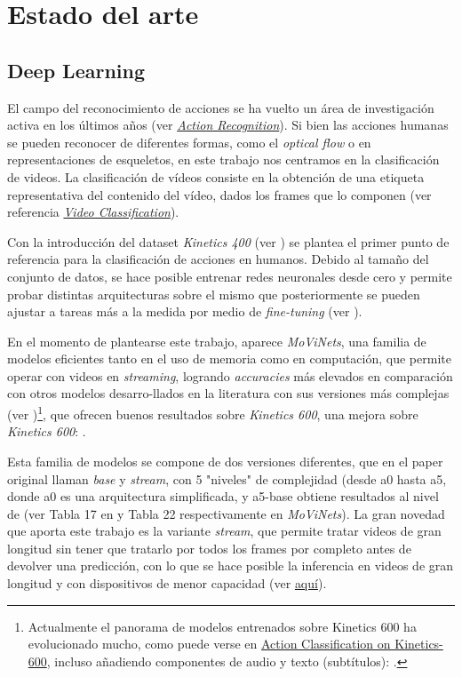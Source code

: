 \chapter{Estado del arte}

\section{Deep Learning}

El campo del reconocimiento de acciones se ha vuelto un área de investigación activa en los últimos años (ver \href{https://paperswithcode.com/task/action-recognition-in-videos}{\textit{Action Recognition}}). Si bien las acciones humanas se pueden reconocer de diferentes formas, como el \textit{optical flow} o en representaciones de esqueletos, en este trabajo nos centramos en la clasificación de videos. La clasificación de vídeos consiste en la obtención de una etiqueta representativa del contenido del vídeo, dados los frames que lo componen (ver referencia \href{Video Classification is the task of producing a label that is relevant to the video given its frames}{\textit{Video Classification}}).

Con la introducción del dataset \textit{Kinetics 400} (ver \cite{Kinetics400}) se plantea el primer punto de referencia para la clasificación de acciones en humanos. Debido al tamaño del conjunto de datos, se hace posible entrenar redes neuronales desde cero y permite probar distintas arquitecturas sobre el mismo que posteriormente se pueden ajustar a tareas más a la medida por medio de \textit{fine-tuning} (ver \cite{I3D}).

En el momento de plantearse este trabajo, aparece \textit{MoViNets}, una familia de modelos eficientes tanto en el uso de memoria como en computación, que permite operar con videos en \textit{streaming}, logrando  \textit{accuracies} más elevados en comparación con otros modelos desarro-llados en la literatura con sus versiones más complejas (ver \cite{MoViNets})\footnote{Actualmente el panorama de modelos entrenados sobre Kinetics 600 ha evolucionado mucho, como puede verse en \href{https://paperswithcode.com/sota/action-classification-on-kinetics-600}{Action Classification on Kinetics-600}, incluso añadiendo componentes de audio y texto (subtítulos): \cite{Merlot}.}, que ofrecen buenos resultados sobre \textit{Kinetics 600}, una mejora sobre \textit{Kinetics 600}: \cite{Kinetics600}.

Esta familia de modelos se compone de dos versiones diferentes, que en el paper original llaman \textit{base} y \textit{stream}, con 5 "niveles" de complejidad (desde a0 hasta a5, donde a0 es una arquitectura simplificada, y a5-base obtiene resultados al nivel de \cite{X3D} (ver Tabla 17 en y Tabla 22 respectivamente en \textit{MoViNets}). La gran novedad que aporta este trabajo es la variante \textit{stream}, que permite tratar videos de gran longitud sin tener que tratarlo por todos los frames por completo antes de devolver una predicción, con lo que se hace posible la inferencia en videos de gran longitud y con dispositivos de menor capacidad (ver \href{https://blog.tensorflow.org/2022/04/video-classification-on-edge-devices.html}{aquí}).

